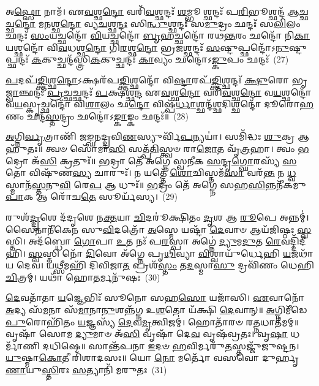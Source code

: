 𑌅\-\ul{𑌫𑍍𑌸𑍋} 𑌨𑌾𑌮᳴। 𑌏\-\ul{𑌵}\-𑌶𑍍𑌛\-\ul{𑌨𑍍𑌦𑍋} 𑌵𑌰𑌿᳴\-\ul{𑌵}\-𑌶𑍍𑌛𑌨𑍍𑌦𑌃᳴ \ul{𑌶}\-𑌮𑍍𑌭𑍂𑌶𑍍𑌛𑌨𑍍𑌦𑌃᳴ 𑌪\-\ul{𑌰𑌿}\-𑌭𑍂𑌶𑍍𑌛𑌨𑍍𑌦᳴ \ul{𑌆}\-𑌚𑍍𑌛𑌚𑍍𑌛\-\ul{𑌨𑍍𑌦𑍋} 𑌮\-\ul{𑌨}\-𑌶𑍍𑌛\-\ul{𑌨𑍍𑌦𑍋} 𑌵𑍍𑌯\-\ul{𑌚}\-𑌶𑍍𑌛\-\ul{𑌨𑍍𑌦𑌃} 𑌸𑌿\-\ul{𑌨𑍍𑌧𑍁}\-𑌶𑍍𑌛𑌨𑍍𑌦𑌃᳴ 𑌸\-\ul{𑌮𑍁}\-𑌦𑍍𑌰𑌂 𑌛𑌨𑍍𑌦𑌃᳴ 𑌸\-\ul{𑌲𑌿}\-𑌲𑌂 𑌛𑌨𑍍𑌦𑌃᳴ \ul{𑌸𑌂}\-𑌯𑌚𑍍𑌛𑌨𑍍𑌦𑍋᳴ \ul{𑌵𑌿}\-𑌯𑌚𑍍𑌛𑌨𑍍𑌦𑍋᳴ \ul{𑌬𑍃}\-𑌹𑌚𑍍𑌛𑌨𑍍𑌦𑍋᳴ 𑌰𑌥\-\ul{𑌨𑍍𑌤}\-𑌰𑌂 𑌛𑌨𑍍𑌦𑍋᳴ 𑌨𑌿\-\ul{𑌕𑌾}\-𑌯𑌶𑍍𑌛𑌨𑍍𑌦𑍋᳴ 𑌵𑌿\-\ul{𑌵}\-𑌧𑌶𑍍𑌛\-\ul{𑌨𑍍𑌦𑍋} 𑌗𑌿\-\ul{𑌰}\-𑌶𑍍𑌛\-\ul{𑌨𑍍𑌦𑍋} 𑌭𑍍𑌰\-\ul{𑌜}\-𑌶𑍍𑌛𑌨𑍍𑌦𑌃᳴ \ul{𑌸}\-𑌷𑍍𑌟𑍁𑌪𑍍𑌛𑌨𑍍𑌦𑍋᳴\-𑌽\-\ul{𑌨𑍁}\-𑌷𑍍𑌟𑍁𑌪𑍍𑌛𑌨𑍍𑌦𑌃᳴ \ul{𑌕}\-𑌕𑍁𑌚𑍍𑌛𑌨𑍍𑌦᳴𑌸𑍍𑌤𑍍𑌰𑌿\-\ul{𑌕}\-𑌕𑍁𑌚𑍍𑌛𑌨𑍍𑌦𑌃᳴ \ul{𑌕𑌾}\-𑌵𑍍𑌯𑌂 𑌛𑌨𑍍𑌦𑍋॑\-𑌽\-\ul{𑌙𑍍𑌕𑍁}\-𑌪𑌂 𑌛𑌨𑍍𑌦𑌃᳴~(27)

\-\ul{𑌪}\-𑌦𑌪᳴\-\ul{𑌙𑍍𑌕𑍍𑌤𑌿}\-𑌶𑍍𑌛\-\ul{𑌨𑍍𑌦𑍋}\-\-𑌽𑌕𑍍𑌷𑌰᳴𑌪\-\ul{𑌙𑍍𑌕𑍍𑌤𑌿}\-𑌶𑍍𑌛𑌨𑍍𑌦𑍋᳴ 𑌵𑌿\-\ul{𑌷𑍍𑌟𑌾}\-𑌰𑌪᳴\-\ul{𑌙𑍍𑌕𑍍𑌤𑌿}\-𑌶𑍍𑌛𑌨𑍍𑌦𑌃᳴ \ul{𑌕𑍍𑌷𑍁}\-𑌰𑍋 𑌭𑍃\-\ul{𑌜𑍍𑌵𑌾}\-𑌞𑍍𑌛𑌨𑍍𑌦𑌃᳴ \ul{𑌪𑍍𑌰}\-𑌚𑍍𑌛𑌚𑍍𑌛𑌨𑍍𑌦𑌃᳴ \ul{𑌪}\-𑌕𑍍𑌷𑌶𑍍𑌛\-\ul{𑌨𑍍𑌦} 𑌏\-\ul{𑌵}\-𑌶𑍍𑌛\-\ul{𑌨𑍍𑌦𑍋} 𑌵𑌰𑌿᳴\-\ul{𑌵}\-𑌶𑍍𑌛\-\ul{𑌨𑍍𑌦𑍋} 𑌵\-\ul{𑌯}\-𑌶𑍍𑌛𑌨𑍍𑌦𑍋᳴ 𑌵\-\ul{𑌯}\-𑌸𑍍𑌕𑍃𑌚𑍍𑌛𑌨𑍍𑌦𑍋᳴ 𑌵𑌿\-\ul{𑌶𑌾}\-𑌲𑌂 𑌛\-\ul{𑌨𑍍𑌦𑍋} 𑌵𑌿𑌷𑍍𑌪᳴\-\ul{𑌰𑍍𑌧𑌾}\-𑌶𑍍𑌛𑌨𑍍𑌦᳴\-\ul{𑌶𑍍𑌛}\-𑌦𑌿𑌶𑍍𑌛𑌨𑍍𑌦𑍋᳴ 𑌦𑍂𑌰𑍋\-\ul{𑌹}\-𑌣𑌂 𑌛𑌨𑍍𑌦᳴\-\ul{𑌸𑍍𑌤}\-𑌨𑍍𑌦𑍍𑌰𑌂 𑌛𑌨𑍍𑌦𑍋॑\-𑌽\-\ul{𑌙𑍍𑌕𑌾}\-𑌙𑍍𑌕𑌂 𑌛𑌨𑍍𑌦𑌃᳴॥~(28)

{\anuvakamend[{\-\ul{𑌅}\-\-\ul{𑌸𑍍𑌯}\-\-\ul{𑌙𑍍𑌕𑍁}\-𑌪𑌞𑍍𑌛\-\ul{𑌨𑍍𑌦}\-𑌸𑍍𑌤𑍍𑌰𑌯᳴𑌸𑍍𑌤𑍍𑌰𑌿𑍞𑌶𑌚𑍍𑌚}]}%

\-\ul{𑌅}\-𑌗𑍍𑌨𑌿\-\ul{𑌰𑍍𑌵𑍃}\-𑌤𑍍𑌰𑌾𑌣𑌿᳴ 𑌜𑌙𑍍𑌘𑌨𑌦𑍍𑌦𑍍𑌰𑌵𑌿\-\ul{𑌣}\-𑌸𑍍𑌯𑍁𑌰𑍍𑌵𑌿᳴\-\ul{𑌪}\-𑌨𑍍𑌯𑌯𑌾॑। 𑌸𑌮𑌿᳴𑌦𑍍𑌧𑌃 \ul{𑌶𑍁}\-𑌕𑍍𑌰 𑌆𑌹𑍁᳴𑌤𑌃॥ 𑌤𑍍𑌵𑍞 𑌸𑍋᳴𑌮𑌾\-\ul{𑌸𑌿} 𑌸𑌤𑍍𑌪᳴\-\ul{𑌤𑌿}\-𑌸𑍍𑌤𑍍𑌵𑍞 𑌰𑌾\-\ul{𑌜𑍋}\-𑌤 𑌵𑍃᳴\-\ul{𑌤𑍍𑌰}\-𑌹𑌾। 𑌤𑍍𑌵𑌂 \ul{𑌭}\-𑌦𑍍𑌰𑍋 𑌅᳴\-\ul{𑌸𑌿} 𑌕𑍍𑌰𑌤𑍁𑌃᳴॥ \ul{𑌭}\-𑌦𑍍𑌰𑌾 𑌤𑍇᳴ 𑌅𑌗𑍍𑌨𑍇 𑌸𑍍𑌵𑌨𑍀𑌕 \ul{𑌸}\-𑌨𑍍𑌦𑍃\-\ul{𑌗𑍍𑌘𑍋}\-𑌰𑌸𑍍𑌯᳴ \ul{𑌸}\-𑌤𑍋 𑌵𑌿𑌷𑍁᳴𑌣\-\ul{𑌸𑍍𑌯} 𑌚𑌾𑌰𑍁𑌃᳴। 𑌨 𑌯𑌤𑍍𑌤𑍇᳴ \ul{𑌶𑍋}\-𑌚𑌿𑌸𑍍𑌤𑌮᳴\-\ul{𑌸𑌾} 𑌵𑌰᳴\-\ul{𑌨𑍍𑌤} 𑌨 \ul{𑌧𑍍𑌵}\-𑌸𑍍𑌮𑌾𑌨᳴\-\ul{𑌸𑍍𑌤}\-𑌨𑍁\-\ul{𑌵𑌿} 𑌰𑍇\-\ul{𑌪} 𑌆 𑌧𑍁𑌃᳴॥ \ul{𑌭}\-𑌦𑍍𑌰𑌂 𑌤𑍇᳴ 𑌅𑌗𑍍𑌨𑍇 𑌸𑌹\-\ul{𑌸𑌿}\-𑌨𑍍𑌨𑌨𑍀᳴𑌕𑌮𑍁\-\ul{𑌪𑌾}\-𑌕 𑌆 𑌰𑍋᳴𑌚\-\ul{𑌤𑍇} 𑌸𑍂𑌰𑍍𑌯᳴𑌸𑍍𑌯।~(29)

𑌰𑍁𑌶᳴\-\ul{𑌦𑍍𑌦𑍃}\-𑌶𑍇 𑌦᳴𑌦𑍃𑌶𑍇 𑌨\-\ul{𑌕𑍍𑌤}\-𑌯𑌾 \ul{𑌚𑌿}\-𑌦𑌰𑍂॑𑌕𑍍𑌷𑌿𑌤𑌂 \ul{𑌦𑍃}\-𑌶 𑌆 \ul{𑌰𑍂}\-𑌪𑍇 𑌅𑌨𑍍𑌨𑌮𑍍॑। 𑌸𑍈𑌨𑌾𑌨𑍀᳴𑌕𑍇𑌨 𑌸𑍁\-\ul{𑌵𑌿}\-𑌦𑌤𑍍𑌰𑍋᳴ \ul{𑌅}\-𑌸𑍍𑌮𑍇 𑌯𑌷𑍍𑌟𑌾᳴ \ul{𑌦𑍇}\-𑌵𑌾𑍞 𑌆𑌯᳴𑌜𑌿𑌷𑍍𑌠𑌃 \ul{𑌸𑍍𑌵}\-𑌸𑍍𑌤𑌿। 𑌅𑌦᳴𑌬𑍍𑌧𑍋 \ul{𑌗𑍋}\-𑌪𑌾 \ul{𑌉}\-𑌤 𑌨𑌃᳴ 𑌪\-\ul{𑌰}\-𑌸𑍍𑌪𑌾 𑌅𑌗𑍍𑌨𑍇॑ \ul{𑌦𑍍𑌯𑍁}\-𑌮\-\ul{𑌦𑍁}\-𑌤 \ul{𑌰𑍇}\-𑌵𑌦𑍍𑌦𑌿᳴𑌦𑍀𑌹𑌿। \ul{𑌸𑍍𑌵}\-𑌸𑍍𑌤𑌿 𑌨𑍋᳴ \ul{𑌦𑌿}\-𑌵𑍋 𑌅᳴𑌗𑍍𑌨𑍇 𑌪𑍃\-\ul{𑌥𑌿}\-𑌵𑍍𑌯𑌾 \ul{𑌵𑌿}\-𑌶𑍍𑌵𑌾𑌯𑍁᳴𑌰𑍍𑌧𑍇𑌹𑌿 \ul{𑌯}\-𑌜𑌥𑌾᳴𑌯 𑌦𑍇𑌵। 𑌯\-\ul{𑌥𑍍𑌸𑍀}\-𑌮𑌹𑌿᳴ 𑌦𑌿𑌵𑌿𑌜𑌾\-\ul{𑌤} 𑌪𑍍𑌰𑌶᳴\-\ul{𑌸𑍍𑌤𑌂} 𑌤\-\ul{𑌦}\-𑌸𑍍𑌮𑌾\-\ul{𑌸𑍁} 𑌦𑍍𑌰𑌵𑌿᳴𑌣𑌂 𑌧𑍇𑌹𑌿 \ul{𑌚𑌿}\-𑌤𑍍𑌰𑌮𑍍। 𑌯𑌥𑌾᳴ 𑌹𑍋\-\ul{𑌤}\-𑌰𑍍𑌮𑌨𑍁᳴𑌷𑌃~(30)

\-\ul{𑌦𑍇}\-𑌵𑌤𑌾᳴𑌤𑌾 \ul{𑌯}\-𑌜𑍍𑌞𑍇𑌭𑌿𑌃᳴ 𑌸𑍂𑌨𑍋 𑌸𑌹\-\ul{𑌸𑍋} 𑌯𑌜𑌾᳴𑌸𑌿। \ul{𑌏}\-𑌵𑌾𑌨𑍋᳴ \ul{𑌅}\-𑌦𑍍𑌯 𑌸᳴\-\ul{𑌮}\-𑌨𑌾 𑌸᳴\-\ul{𑌮𑌾}\-𑌨𑌾\-\ul{𑌨𑍁}\-𑌶𑌨𑍍𑌨᳴𑌗𑍍𑌨 𑌉\-\ul{𑌶}\-𑌤𑍋 𑌯᳴𑌕𑍍𑌷𑌿 \ul{𑌦𑍇}\-𑌵𑌾𑌨𑍍॥ \ul{𑌅}\-𑌗𑍍𑌨𑌿𑌮𑍀᳴𑌡𑍇 \ul{𑌪𑍁}\-𑌰𑍋𑌹𑌿᳴𑌤𑌂 \ul{𑌯}\-𑌜𑍍𑌞𑌸𑍍𑌯᳴ \ul{𑌦𑍇}\-𑌵\-\ul{𑌮𑍃}\-𑌤𑍍𑌵𑌿𑌜𑌮𑍍॑। 𑌹𑍋𑌤𑌾᳴𑌰𑍞 𑌰\-\ul{𑌤𑍍𑌨}\-𑌧𑌾𑌤᳴𑌮𑌮𑍍॥ 𑌵𑍃𑌷𑌾᳴ 𑌸𑍋𑌮 \ul{𑌦𑍍𑌯𑍁}\-𑌮𑌾𑍞 𑌅᳴\-\ul{𑌸𑌿} 𑌵𑍃𑌷𑌾᳴ 𑌦𑍇\-\ul{𑌵} 𑌵𑍃𑌷᳴𑌵𑍍𑌰𑌤𑌃। 𑌵𑍃\-\ul{𑌷𑌾} 𑌧𑌰𑍍𑌮𑌾᳴𑌣𑌿 𑌦𑌧𑌿𑌷𑍇॥ 𑌸𑌾𑌨𑍍𑌤᳴𑌪𑌨𑌾 \ul{𑌇}\-𑌦𑍞 \ul{𑌹}\-𑌵𑌿𑌰𑍍𑌮𑌰𑍁᳴\-\ul{𑌤}\-𑌸𑍍𑌤𑌜𑍍𑌜𑍁᳴𑌜𑍁𑌷𑍍𑌟𑌨। \ul{𑌯𑍁}\-𑌷𑍍𑌮𑌾\-\ul{𑌕𑍋}\-𑌤𑍀 𑌰𑌿᳴𑌶𑌾𑌦𑌸𑌃॥ 𑌯𑍋 \ul{𑌨𑍋} 𑌮𑌰𑍍𑌤𑍋᳴ 𑌵𑌸𑌵𑍋 𑌦𑍁𑌰𑍍\mbox{}𑌹𑍃\-\ul{𑌣𑌾}\-𑌯𑍁\-\ul{𑌸𑍍𑌤𑌿}\-𑌰𑌃 \ul{𑌸}\-𑌤𑍍𑌯𑌾𑌨𑌿᳴ 𑌮𑌰𑍁𑌤𑌃~(31)


